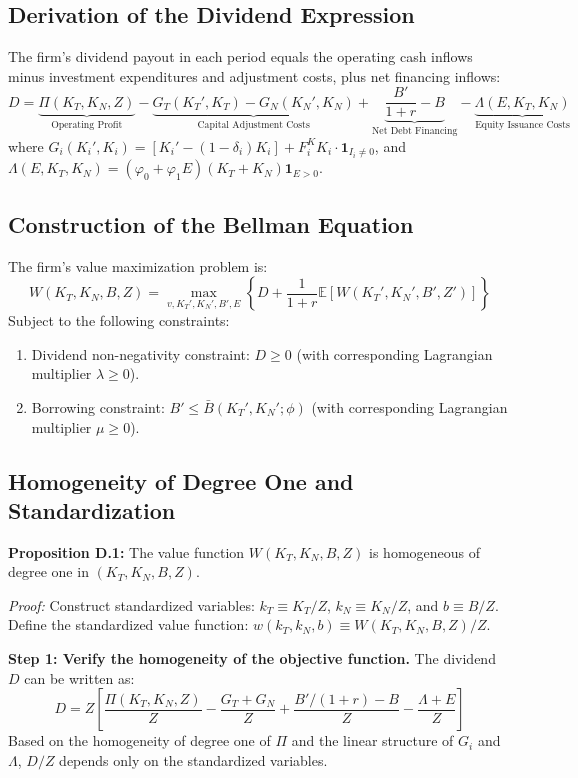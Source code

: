 \documentclass[12pt,a4paper]{article}
\begin{document}
\subsection{Derivation of the Dividend Expression}
The firm's dividend payout in each period equals the operating cash inflows minus investment expenditures and adjustment costs, plus net financing inflows:
\begin{equation}
D = \underbrace{\Pi(K_T, K_N, Z)}_{\text{Operating Profit}} - \underbrace{G_T(K_T', K_T) - G_N(K_N', K_N)}_{\text{Capital Adjustment Costs}} + \underbrace{\frac{B'}{1+r} - B}_{\text{Net Debt Financing}} - \underbrace{\Lambda(E, K_T, K_N) }_{\text{Equity Issuance Costs}}
\end{equation}
where $G_i(K_i', K_i) = [K_i' - (1-\delta_i)K_i] + F_i^K K_i \cdot \mathbf{1}_{I_i \neq 0}$, and $\Lambda(E, K_T, K_N) = (\varphi_0 + \varphi_1 E)(K_T + K_N) \mathbf{1}_{E > 0}$.

\subsection{Construction of the Bellman Equation}
The firm's value maximization problem is:
\begin{equation}
W(K_T, K_N, B, Z) = \max_{v, K_T', K_N', B', E} \left\{ D + \frac{1}{1+r} \mathbb{E} [W(K_T', K_N', B', Z')] \right\}
\end{equation}
Subject to the following constraints:
\begin{enumerate}
    \item Dividend non-negativity constraint: $D \ge 0$ (with corresponding Lagrangian multiplier $\lambda \ge 0$).
    \item Borrowing constraint: $B' \le \bar{B}(K_T', K_N'; \phi)$ (with corresponding Lagrangian multiplier $\mu \ge 0$).
\end{enumerate}

\subsection{Homogeneity of Degree One and Standardization}
\textbf{Proposition D.1:} The value function $W(K_T, K_N, B, Z)$ is homogeneous of degree one in $(K_T, K_N, B, Z)$.

\textit{Proof:}
Construct standardized variables: $k_T \equiv K_T/Z$, $k_N \equiv K_N/Z$, and $b \equiv B/Z$.
Define the standardized value function: $w(k_T, k_N, b) \equiv W(K_T, K_N, B, Z)/Z$.

\textbf{Step 1: Verify the homogeneity of the objective function.}
The dividend $D$ can be written as:
\begin{equation}
D = Z \left[ \frac{\Pi(K_T, K_N, Z)}{Z} - \frac{G_T + G_N}{Z} + \frac{B'/(1+r) - B}{Z} - \frac{\Lambda + E}{Z} \right]
\end{equation}
Based on the homogeneity of degree one of $\Pi$ and the linear structure of $G_i$ and $\Lambda$, $D/Z$ depends only on the standardized variables.
\end{document}
